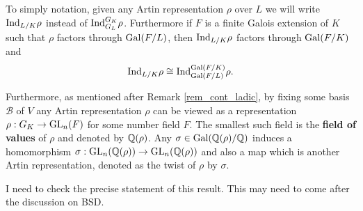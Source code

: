 To simply notation, given any Artin representation $\rho$ over $L$ we will write $\mathrm{Ind}_{L/K}\rho$ instead of $\mathrm{Ind}_{G_L}^{G_K}\rho$. Furthermore if $F$ is a finite Galois extension of $K$ such that $\rho$ factors through $\mathrm{Gal}(F/L)$, then $\mathrm{Ind}_{L/K}\rho$ factors through $\mathrm{Gal}(F/K)$ and 
$$\mathrm{Ind}_{L/K}\rho\cong\mathrm{Ind}_{\mathrm{Gal}(F/L)}^{\mathrm{Gal}(F/K)}\rho.$$

Furthermore, as mentioned after Remark \ref{rem_cont_ladic}, by fixing some basis $\mathcal{B}$ of $V$ any Artin representation $\rho$ can be viewed as a representation $\rho:G_K\to\mathrm{GL}_n(F)$ for some number field $F$. The smallest such field is the \textbf{field of values} of $\rho$ and denoted by $\mathbb{Q}(\rho)$. Any $\sigma\in\mathrm{Gal}(\mathbb{Q}(\rho)/\mathbb{Q})$ induces a homomorphism $\sigma:\mathrm{GL}_n(\mathbb{Q}(\rho))\to\mathrm{GL}_n(\mathbb{Q}(\rho))$ and also a map
which is another Artin representation, denoted as the twist of $\rho$ by $\sigma$.

\begin{conj}
    I need to check the precise statement of this result. This may need to come after the discussion on BSD.
\end{conj}
